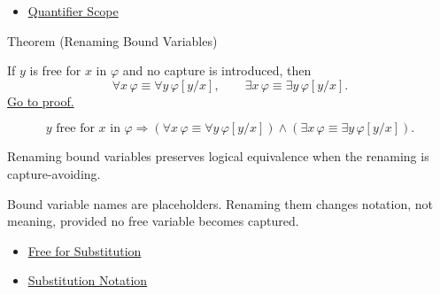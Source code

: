 \begin{dependencies}
\begin{itemize}
  \item \hyperref[def:quantifier-scope]{Quantifier Scope}
\end{itemize}
\end{dependencies}

\begin{theorembox}{Theorem (Renaming Bound Variables)}
\begin{theorem}
\label{thm:rename}
If \(y\) is free for \(x\) in \(\varphi\) and no capture is introduced, then
\[
\forall x\,\varphi\equiv\forall y\,\varphi[y/x],
\qquad
\exists x\,\varphi\equiv\exists y\,\varphi[y/x].
\]
\hyperref[prf:rename]{Go to proof.}
\end{theorem}
\end{theorembox}

\begin{remark*}
\[
y \text{ free for } x \text{ in } \varphi
\Rightarrow
(\forall x\,\varphi\equiv\forall y\,\varphi[y/x])
\land
(\exists x\,\varphi\equiv\exists y\,\varphi[y/x]).
\]
\end{remark*}

\begin{remark*}
Renaming bound variables preserves logical equivalence when the renaming is
capture-avoiding.
\end{remark*}

\begin{remark*}[Interpretation]
Bound variable names are placeholders. Renaming them changes notation, not
meaning, provided no free variable becomes captured.
\end{remark*}

\begin{dependencies}
\begin{itemize}
  \item \hyperref[def:free-for]{Free for Substitution}
  \item \hyperref[def:subst-notation]{Substitution Notation}
\end{itemize}
\end{dependencies}
